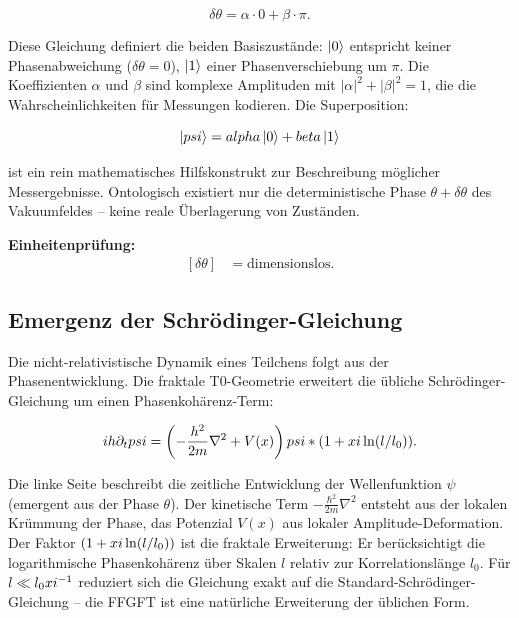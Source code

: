 	\begin{equation}
		\delta \theta = \alpha \cdot 0 + \beta \cdot \pi.
	\end{equation}
	
	Diese Gleichung definiert die beiden Basiszustände: \(\ket{0}\) entspricht keiner Phasenabweichung (\(\delta \theta = 0\)), \(\ket{1}\) einer Phasenverschiebung um \(\pi\). Die Koeffizienten \(\alpha\) und \(\beta\) sind komplexe Amplituden mit \(|\alpha|^2 + |\beta|^2 = 1\), die die Wahrscheinlichkeiten für Messungen kodieren. Die Superposition:
	
	\begin{equation}
		\ket{psi} = alpha \ket{0} + beta \ket{1}
	\end{equation}
	
	ist ein rein mathematisches Hilfskonstrukt zur Beschreibung möglicher Messergebnisse. Ontologisch existiert nur die deterministische Phase \(\theta + \delta \theta\) des Vakuumfeldes – keine reale Überlagerung von Zuständen.
	
	\textbf{Einheitenprüfung:}
	\[
	\begin{aligned}
		[\delta \theta] &= \text{dimensionslos}.
	\end{aligned}
	\]
	
	\subsection*{Emergenz der Schrödinger-Gleichung}
	
	Die nicht-relativistische Dynamik eines Teilchens folgt aus der Phasenentwicklung. Die fraktale T0-Geometrie erweitert die übliche Schrödinger-Gleichung um einen Phasenkohärenz-Term:
	
	\begin{equation}
		i h \partial_t psi = \left( -\frac{h^2}{2m} \nabla^2 + V(x) \right) psi * (1 + xi \ln(l/l_0)).
	\end{equation}
	
	Die linke Seite beschreibt die zeitliche Entwicklung der Wellenfunktion \(\psi\) (emergent aus der Phase \(\theta\)). Der kinetische Term \(-\frac{\hbar^2}{2m} \nabla^2\) entsteht aus der lokalen Krümmung der Phase, das Potenzial \(V(x)\) aus lokaler Amplitude-Deformation. Der Faktor \((1 + xi \ln(l/l_0))\) ist die fraktale Erweiterung: Er berücksichtigt die logarithmische Phasenkohärenz über Skalen \(l\) relativ zur Korrelationslänge \(l_0\). Für \(l \ll l_0 xi^{-1}\) reduziert sich die Gleichung exakt auf die Standard-Schrödinger-Gleichung – die FFGFT ist eine natürliche Erweiterung der üblichen Form.
	

